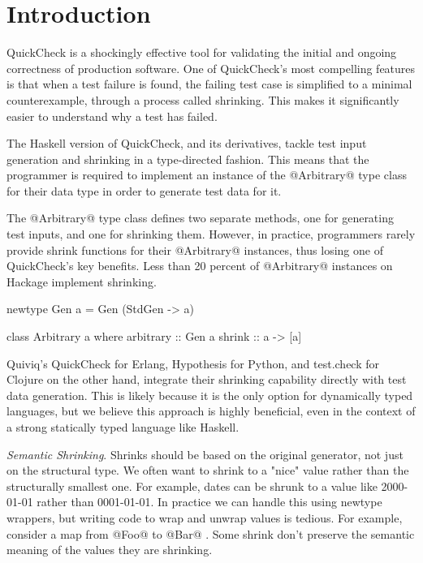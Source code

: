 \section{Introduction}

QuickCheck\cite{claessen:quickcheck} is a shockingly effective tool for validating the initial and ongoing correctness of production software. One of QuickCheck's most compelling features is that when a test failure is found, the failing test case is simplified to a minimal counterexample, through a process called shrinking. This makes it significantly easier to understand why a test has failed.

The Haskell version of QuickCheck, and its derivatives, tackle test input generation and shrinking in a type-directed fashion. This means that the programmer is required to implement an instance of the @Arbitrary@ type class for their data type in order to generate test data for it.

The @Arbitrary@ type class defines two separate methods, one for generating test inputs, and one for shrinking them. However, in practice, programmers rarely provide shrink functions for their @Arbitrary@ instances, thus losing one of QuickCheck's key benefits. Less than 20 percent of @Arbitrary@ instances on Hackage implement shrinking.

\begin{code}
  newtype Gen a =
    Gen (StdGen -> a)

  class Arbitrary a where
    arbitrary :: Gen a
    shrink    :: a -> [a]
\end{code}

Quiviq's QuickCheck for Erlang, Hypothesis for Python, and test.check for Clojure on the other hand, integrate their shrinking capability directly with test data generation. This is likely because it is the only option for dynamically typed languages, but we believe this approach is highly beneficial, even in the context of a strong statically typed language like Haskell.

\emph{Semantic Shrinking}. Shrinks should be based on the original generator, not just on the structural type. We often want to shrink to a "nice" value rather than the structurally smallest one. For example, dates can be shrunk to a value like 2000-01-01 rather than 0001-01-01. In practice we can handle this using newtype wrappers, but writing code to wrap and unwrap values is tedious. For example, consider a map from @Foo@ to @Bar@ . Some shrink don't preserve the semantic meaning of the values they are shrinking.

